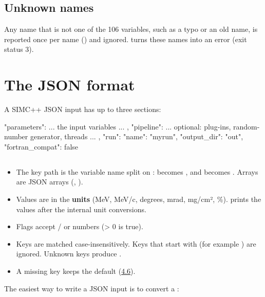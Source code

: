 \subsection{\texorpdfstring{Unknown names}{Unknown names}}\label{user_manual-04u5finputs:414-unknown-names}
Any name that is not one of the 106 variables, such as a typo or an old name, is reported once per name
() and ignored.  turns these names into an error (exit
status 3).

\section{\texorpdfstring{The JSON format}{The JSON format}}\label{user_manual-04u5finputs:42-the-json-format}
A SIMC++ JSON input has up to three sections:

\begin{simccode}[basicstyle=\ttfamily\footnotesize,style=simcjson]
{
  "parameters": { ... the input variables ... },
  "pipeline":   { ... optional: plug-ins, random-number generator, threads ... },
  "run":        { "name": "myrun", "output_dir": "out", "fortran_compat": false }
}
\end{simccode}
\subsection{\texorpdfstring{}{parameters}}\label{user_manual-04u5finputs:421-parameters}
\begin{itemize}
\item The key path is the variable name split on \code{\%}: \hyperref[param:targu25thick]{} becomes , and
\hyperref[param:SPedgeu25eu25deltau25min]{} becomes . Arrays are JSON arrays
(, ).
\item Values are in the \textbf{ units} (MeV, MeV/c, degrees, mrad, mg/cm², \%).  prints the values after
the internal unit conversions.
\item Flags accept / or numbers (> 0 is true).
\item Keys are matched case-insensitively. Keys that start with \code{\_} (for example ) are ignored. Unknown keys
produce .
\item A missing key keeps the default (\hyperref[user_manual-04u5finputs:46-parameter-reference]{4.6}).
\end{itemize}
The easiest way to write a JSON input is to convert a :

